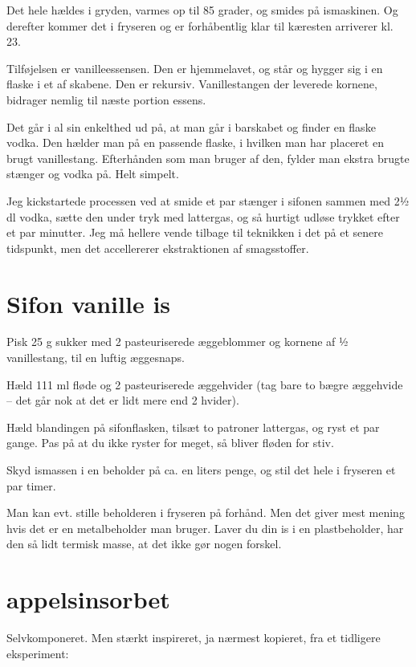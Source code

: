 \documentclass[
]{book}
\begin{document}
Det hele hældes i gryden, varmes op til 85 grader, og smides på ismaskinen. Og derefter kommer det i fryseren og er forhåbentlig klar til kæresten arriverer kl. 23.~

Tilføjelsen er vanilleessensen. Den er hjemmelavet, og står og hygger sig i en flaske i et af skabene. Den er rekursiv. Vanillestangen der leverede kornene, bidrager nemlig til næste portion essens.

Det går i al sin enkelthed ud på, at man går i barskabet og finder en flaske vodka. Den hælder man på en passende flaske, i hvilken man har placeret en brugt vanillestang. Efterhånden som man bruger af den, fylder man ekstra brugte stænger og vodka på. Helt simpelt.

Jeg kickstartede processen ved at smide et par stænger i sifonen sammen med 2½ dl vodka, sætte den under tryk med lattergas, og så hurtigt udløse trykket efter et par minutter. Jeg må hellere vende tilbage til teknikken i det på et senere tidspunkt, men det accellererer ekstraktionen af smagsstoffer.

\hypertarget{sifon-vanille-is}{%
\section{Sifon vanille is}\label{sifon-vanille-is}}

Pisk 25 g sukker med 2 pasteuriserede æggeblommer og kornene af ½ vanillestang, til en luftig æggesnaps.

Hæld 111 ml fløde og 2 pasteuriserede æggehvider (tag bare to bægre æggehvide -- det går nok at det er lidt mere end 2 hvider).

Hæld blandingen på sifonflasken, tilsæt to patroner lattergas, og ryst et par gange. Pas på at du ikke ryster for meget, så bliver fløden for stiv.

Skyd ismassen i en beholder på ca. en liters penge, og stil det hele i fryseren et par timer.

Man kan evt. stille beholderen i fryseren på forhånd. Men det giver mest mening hvis det er en metalbeholder man bruger. Laver du din is i en plastbeholder, har den så lidt termisk masse, at det ikke gør nogen forskel.

\hypertarget{appelsinsorbet}{%
\section{appelsinsorbet}\label{appelsinsorbet}}

Selvkomponeret. Men stærkt inspireret, ja nærmest kopieret, fra et tidligere eksperiment:
\end{document}
